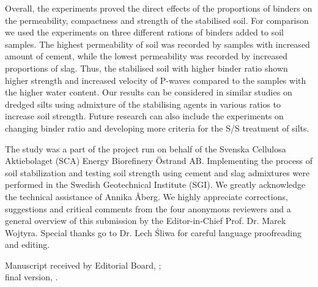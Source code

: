 \documentclass{amestyle}
\begin{document}
Overall, the experiments proved the direct effects of the proportions of binders on the permeability, compactness and strength of the stabilised soil. For comparison we used the experiments on three different rations of binders added to soil samples. The highest permeability of soil was recorded by samples with increased amount of cement, while the lowest permeability was recorded by increased proportions of slag. Thus, the stabilised soil with higher binder ratio shown higher strength and increased velocity of P-waves compared to the samples with the higher water content. Our results can be considered in similar studies on dredged silts using admixture of the stabilising agents in various ratios to increase soil strength. Future research can also include the experiments on changing binder ratio and developing more criteria for the S/S treatment of silts.

\begin{acknowledgements}
The study was a part of the project run on behalf of the Svenska Cellulosa Aktiebolaget (SCA) Energy Biorefinery \"Ostrand AB. Implementing the process of soil stabilization and testing soil strength using cement and slag admixtures were performed in the Swedish Geotechnical Institute (SGI).
We greatly acknowledge the technical assistance of Annika Åberg. We highly appreciate corrections, suggestions and critical comments from the four anonymous reviewers and a general overview of this submission by the Editor-in-Chief Prof. Dr. Marek Wojtyra. Special thanks go to Dr. Lech Śliwa for careful language proofreading and editing.
\end{acknowledgements}

\begin{receiptnote}
  Manuscript received by Editorial Board, \theamereceived; \\ 
  final version, \theameaccepted.
\end{receiptnote}



%
%

%
%

\end{document}
